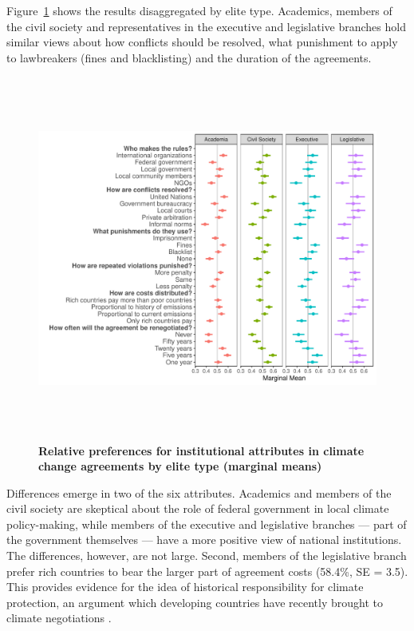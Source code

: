 \documentclass[a4paper,12pt]{article}
\begin{document}
Figure~\ref{fig:types} shows the results disaggregated by elite type. Academics, members of the civil society and representatives in the executive and legislative branches hold similar views about how conflicts should be resolved, what punishment to apply to lawbreakers (fines and blacklisting) and the duration of the agreements.

\begin{figure}[H]
	\centering
	\includegraphics[height=12cm]{MM_membertype.pdf}
	\caption{\textbf{Relative preferences for institutional attributes in climate change agreements by elite type (marginal means)}}
	\label{fig:types}
\end{figure}

Differences emerge in two of the six attributes. Academics and members of the civil society are skeptical about the role of federal government in local climate policy-making, while members of the executive and legislative branches --- part of the government themselves --- have a more positive view of national institutions. The differences, however, are not large. Second, members of the legislative branch prefer rich countries to bear the larger part of agreement costs (58.4\%, SE = 3.5). This provides evidence for the idea of historical responsibility for climate protection, an argument which developing countries have recently brought to climate negotiations \citep{muller2009differentiating, friman2015agreement}.
\end{document}
